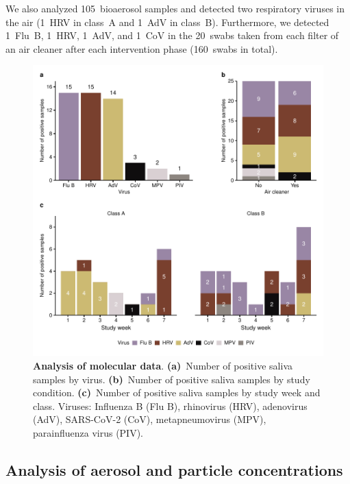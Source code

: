 \documentclass[fleqn,11pt]{wlscirep}
\begin{document}
We also analyzed 105~bioaerosol samples and detected  two respiratory viruses in the air (1~HRV in class~A and 1~AdV in class~B). Furthermore, we detected 1~Flu~B, 1~HRV, 1~AdV, and 1~CoV in the 20~swabs taken from each filter of an air cleaner after each intervention phase (160~swabs in total).


\begin{figure}[!htpb]
    \centering
    \includegraphics{../../results/mol-data/descriptives.pdf}
    \caption{\textbf{Analysis of molecular data}. \textbf{(a)}~Number of positive saliva samples by virus. \textbf{(b)}~Number of positive saliva samples by study condition. \textbf{(c)}~Number of positive saliva samples by study week and class. Viruses: Influenza B (Flu B), rhinovirus (HRV), adenovirus (AdV), SARS-CoV-2 (CoV), metapneumovirus (MPV), parainfluenza virus (PIV).}
    \label{fig:molecular-descriptives}
\end{figure}

\subsection{Analysis of aerosol and particle concentrations}
\end{document}
